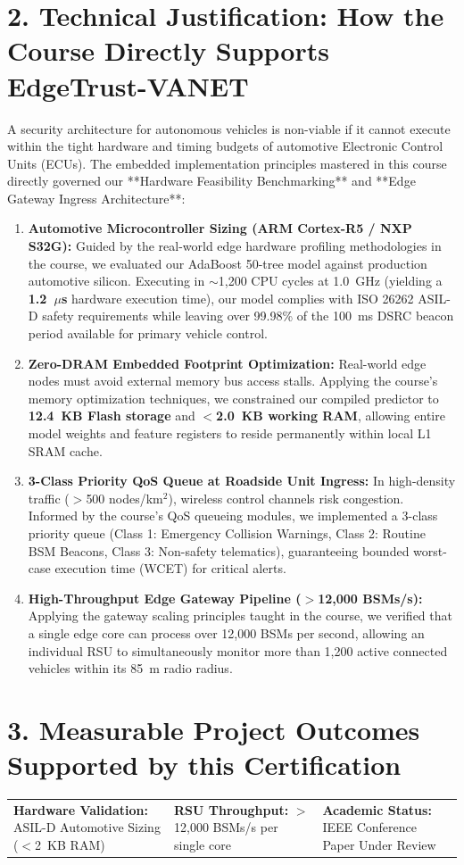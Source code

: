 \documentclass[10pt,a4paper]{article}
\begin{document}
\section*{2. Technical Justification: How the Course Directly Supports EdgeTrust-VANET}
A security architecture for autonomous vehicles is non-viable if it cannot execute within the tight hardware and timing budgets of automotive Electronic Control Units (ECUs). The embedded implementation principles mastered in this course directly governed our **Hardware Feasibility Benchmarking** and **Edge Gateway Ingress Architecture**:

\begin{enumerate}
    \item \textbf{Automotive Microcontroller Sizing (ARM Cortex-R5 / NXP S32G):} 
    Guided by the real-world edge hardware profiling methodologies in the course, we evaluated our AdaBoost 50-tree model against production automotive silicon. Executing in $\sim$1,200 CPU cycles at 1.0~GHz (yielding a \textbf{1.2~$\mu$s} hardware execution time), our model complies with ISO 26262 ASIL-D safety requirements while leaving over 99.98\% of the 100~ms DSRC beacon period available for primary vehicle control.

    \item \textbf{Zero-DRAM Embedded Footprint Optimization:} 
    Real-world edge nodes must avoid external memory bus access stalls. Applying the course's memory optimization techniques, we constrained our compiled predictor to \textbf{12.4~KB Flash storage} and \textbf{$<$2.0~KB working RAM}, allowing entire model weights and feature registers to reside permanently within local L1 SRAM cache.

    \item \textbf{3-Class Priority QoS Queue at Roadside Unit Ingress:} 
    In high-density traffic ($>$500 nodes/km$^2$), wireless control channels risk congestion. Informed by the course's QoS queueing modules, we implemented a 3-class priority queue (Class 1: Emergency Collision Warnings, Class 2: Routine BSM Beacons, Class 3: Non-safety telematics), guaranteeing bounded worst-case execution time (WCET) for critical alerts.

    \item \textbf{High-Throughput Edge Gateway Pipeline ($>$12,000 BSMs/s):} 
    Applying the gateway scaling principles taught in the course, we verified that a single edge core can process over 12,000 BSMs per second, allowing an individual RSU to simultaneously monitor more than 1,200 active connected vehicles within its 85~m radio radius.
\end{enumerate}

\section*{3. Measurable Project Outcomes Supported by this Certification}
\noindent
\begin{tabularx}{\textwidth}{@{}X X X@{}}
    \textbf{Hardware Validation:} ASIL-D Automotive Sizing ($<$2~KB RAM) & 
    \textbf{RSU Throughput:} $>$12,000 BSMs/s per single core & 
    \textbf{Academic Status:} IEEE Conference Paper Under Review \\
\end{tabularx}
\end{document}
